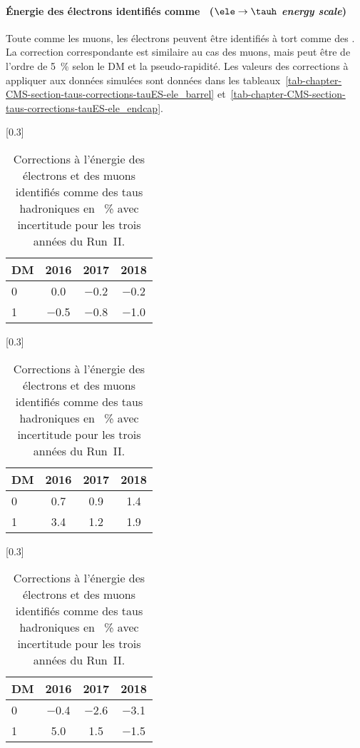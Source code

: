 \paragraph{Énergie des électrons identifiés comme \tauh\ (\emph{$\ele\to\tauh$ energy scale})}
Toute comme les muons, les électrons peuvent être identifiés à tort comme des \tauh.
La correction correspondante est similaire au cas des muons, mais peut être de l'ordre de \SI{5}{\%} selon le DM et la pseudo-rapidité.
Les valeurs des corrections à appliquer aux données simulées sont données dans les tableaux~\ref{tab-chapter-CMS-section-taus-corrections-tauES-ele_barrel} et~\ref{tab-chapter-CMS-section-taus-corrections-tauES-ele_endcap}.
\begin{table}[h]
\centering
{}[0.3\textwidth]
{\begin{tabular}{lccc}
\toprule
DM & 2016 & 2017 & 2018\\
\midrule
0 & \num{0.0} & \num{-0.2} & \num{-0.2} \\
1 & \num{-0.5} & \num{-0.8} & \num{-1.0} \\
\bottomrule
\end{tabular}}
\hfill
{}[0.3\textwidth]
{\begin{tabular}{lccc}
\toprule
DM & 2016 & 2017 & 2018\\
\midrule
0 & \num{0.7} & \num{0.9} & \num{1.4} \\
1 & \num{3.4} & \num{1.2} & \num{1.9} \\
\bottomrule
\end{tabular}}
\hfill
{}[0.3\textwidth]
{\begin{tabular}{lccc}
\toprule
DM & 2016 & 2017 & 2018\\
\midrule
0 & \num{-0.4} & \num{-2.6} & \num{-3.1} \\
1 & \num{5.0} & \num{1.5} & \num{-1.5} \\
\bottomrule
\end{tabular}}
\caption[Corrections à l'énergie des leptons identifiés comme des taus hadroniques.]{Corrections à l'énergie des électrons et des muons identifiés comme des taus hadroniques en \SI{}{\%} avec incertitude pour les trois années du Run~II.}
\label{tab-chapter-CMS-section-taus-corrections-tauES-leptons}
\end{table}
